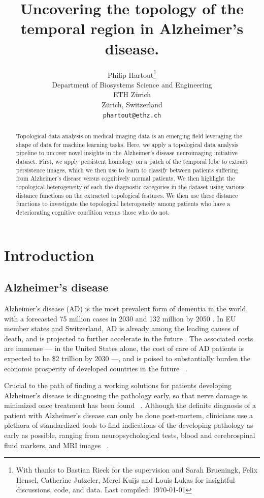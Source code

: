 \documentclass{article}
\title{Uncovering the topology of the temporal region in Alzheimer's disease.}
\author{%
  Philip Hartout\thanks{With thanks to Bastian Rieck for the supervision and Sarah Brueningk, Felix Hensel, Catherine Jutzeler, Merel Kuijs and Louis Lukas for insightful discussions, code, and data. Last compiled: \today}\\
  Department of Biosystems Science and Engineering\\
  ETH Zürich\\
  Zürich, Switzerland \\
  \texttt{phartout@ethz.ch} \\
}
\begin{document}
\maketitle

\begin{abstract}
Topological data analysis on medical imaging data is an emerging field leveraging the shape of data for machine learning tasks. Here, we apply a topological data analysis pipeline to uncover novel insights in the Alzheimer's disease neuroimaging initiative dataset. First, we apply persistent homology on a patch of the temporal lobe to extract persistence images, which we then use to learn to classify between patients suffering from Alzheimer's disease versus cognitively normal patients. We then highlight the topological heterogeneity of each the diagnostic categories in the dataset using various distance functions on the extracted topological features.  We then use these distance functions to investigate the topological heterogeneity among patients who have a deteriorating cognitive condition versus those who do not.
\end{abstract}

\section{Introduction}

\subsection{Alzheimer's disease}\label{sec:ad_context}

Alzheimer's disease (AD) is the most prevalent form of dementia in the world, with a forecasted 75 million cases in 2030 and 132 million by 2050 \citep{world2017global}. In EU member states and Switzerland, AD is already among the leading causes of death, and is projected to further accelerate in the future \citep{sleeman2019escalating}. The associated costs are immense --- in the United States alone, the cost of care of AD patients is expected to be \$2 trillion by 2030 ---, and is poised to substantially burden the economic prosperity of developed countries in the future ~\citep{world2017global}.

Crucial to the path of finding a working solutions for patients developing Alzheimer's disease is diagnosing the pathology early, so that nerve damage is minimized once treatment has been found ~\citep{yiannopoulou2020current}. Although the definite diagnosis of a patient with Alzheimer's disease can only be done post-mortem, clinicians use a plethora of standardized tools to find indications of the developing pathology as early as possible, ranging from neuropsychological tests, blood and cerebrospinal fluid markers, and MRI images ~\citep{mckhann2011diagnosis, lehmann2016biomarkers, smits2012early}.
\end{document}
